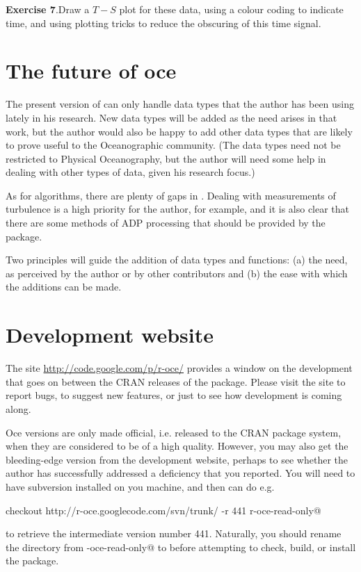 \documentclass{article}
\newcommand{\workedexercise}[2]{
	\vspace{2ex plus 2ex minus 1ex}
	\begin{boxedminipage}[c]{0.95\linewidth}
		{\textbf{Exercise #1}.\hspace{1em}#2}
	\end{boxedminipage}
	\vspace{2ex plus 2ex minus 1ex}
}
\begin{document}
\workedexercise{7}{Draw a $T-S$ plot for these data, using a colour coding to indicate time,
and using plotting tricks to reduce the obscuring of this time signal.}


\section{The future of oce}

The present version of \verb@oce@ can only handle data types that the author has
been using lately in his research. New data types will be added as the need
arises in that work, but the author would also be happy to add other data types
that are likely to prove useful to the Oceanographic community.  (The data types
need not be restricted to Physical Oceanography, but the author will need some
help in dealing with other types of data, given his research focus.)

As for algorithms, there are plenty of gaps in \verb@oce@.  Dealing with
measurements of turbulence is a high priority for the author, for example, and
it is also clear that there are some methods of ADP processing that should be
provided by the package.

Two principles will guide the addition of data types and functions:
(a) the need, as perceived by the author or by other contributors and
(b) the ease with which the additions can be made.

\section{Development website}

The site \url{http://code.google.com/p/r-oce/} provides a window on the
development that goes on between the CRAN releases of the package. Please visit
the site to report bugs, to suggest new features, or just to see how \verb@oce@
development is coming along.

Oce versions are only made official, i.e. released to the CRAN package system,
when they are considered to be of a high quality.  However, you may also get the
bleeding-edge version from the development website, perhaps to see whether the
author has successfully addressed a deficiency that you reported.  You will need
to have subversion installed on you machine, and then can do e.g.

\verb@svn checkout http://r-oce.googlecode.com/svn/trunk/ -r 441 r-oce-read-only@

\noindent to retrieve the intermediate version number 441. Naturally, you should
rename the directory from \verb@r-oce-read-only@ to \verb@oce@ before attempting
to check, build, or install the package.
\end{document}
